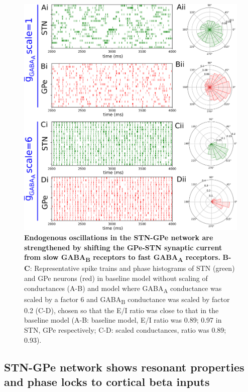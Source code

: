 \begin{figure}
\centering
\includegraphics[width=\textwidth]{ch_detailed_model/figs_split/fig_endogenous_sweep-gaba-AB_B-rasters-phases.png}
\caption{
\textbf{Endogenous oscillations in the STN-GPe network are strengthened by shifting the GPe-STN synaptic current from slow GABA\textsubscript{B} receptors to fast GABA\textsubscript{A} receptors.}
\textbf{B-C}: Representative spike trains and phase histograms of STN (green) and GPe neurons (red) in baseline model without scaling of conductances (A-B) and model where GABA\textsubscript{A} conductance was scaled by a factor 6 and GABA\textsubscript{B} conductance was scaled by factor 0.2 (C-D), chosen so that the E/I ratio was close to that in the baseline model (A-B: baseline model, E/I ratio was 0.89; 0.97 in STN, GPe respectively; C-D: scaled conductances, ratio was 0.89; 0.93).
}
\label{fig:endogenous_sweep-gaba-AB-gpe-stn_B-rasters-phases}
\end{figure}

%
%
\subsection{STN-GPe network shows resonant properties and phase locks to cortical beta inputs}
\label{sec:patterned-loop_sweep-burst-freq}

